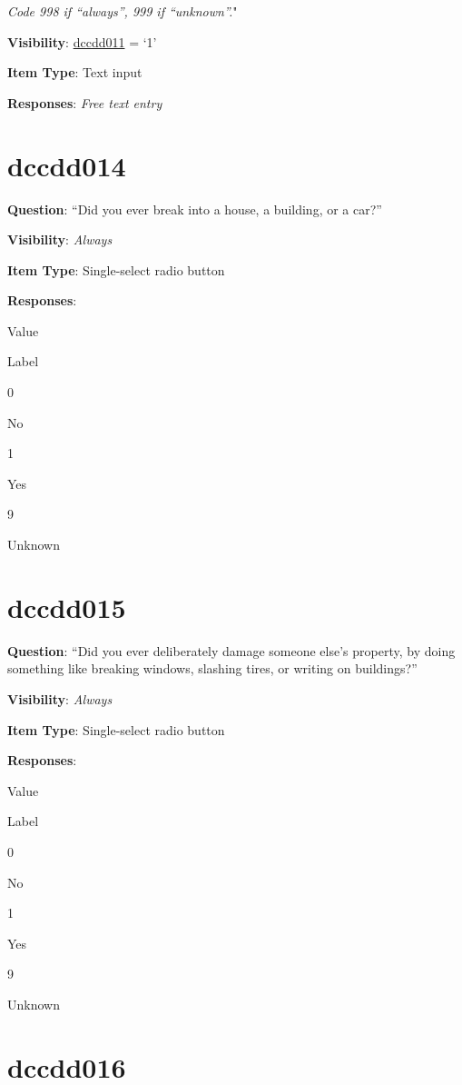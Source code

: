 \documentclass[]{book}
\begin{document}
\emph{Code 998 if ``always'', 999 if ``unknown''.}"

\textbf{Visibility}: \protect\hyperlink{dccdd011}{dccdd011} = `1'

\textbf{Item Type}: Text input

\textbf{Responses}: \emph{Free text entry}

\hypertarget{dccdd014}{%
\section{dccdd014}\label{dccdd014}}

\textbf{Question}: ``Did you ever break into a house, a building, or a car?''

\textbf{Visibility}: \emph{Always}

\textbf{Item Type}: Single-select radio button

\textbf{Responses}:

Value

Label

0

No

1

Yes

9

Unknown

\hypertarget{dccdd015}{%
\section{dccdd015}\label{dccdd015}}

\textbf{Question}: ``Did you ever deliberately damage someone else's property, by doing something like breaking windows, slashing tires, or writing on buildings?''

\textbf{Visibility}: \emph{Always}

\textbf{Item Type}: Single-select radio button

\textbf{Responses}:

Value

Label

0

No

1

Yes

9

Unknown

\hypertarget{dccdd016}{%
\section{dccdd016}\label{dccdd016}}
\end{document}
